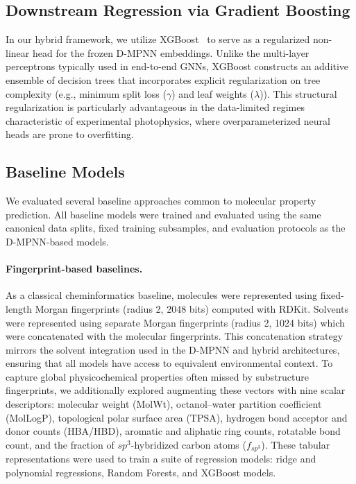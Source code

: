 \subsection{Downstream Regression via Gradient Boosting}
In our hybrid framework, we utilize XGBoost~\cite{chen2016xgboost} to serve as a regularized non-linear head for the frozen D-MPNN embeddings. Unlike the multi-layer perceptrons typically used in end-to-end GNNs, XGBoost constructs an additive ensemble of decision trees that incorporates explicit regularization on tree complexity (e.g., minimum split loss ($\gamma$) and leaf weights ($\lambda$)). This structural regularization is particularly advantageous in the data-limited regimes characteristic of experimental photophysics, where overparameterized neural heads are prone to overfitting.


\subsection{Baseline Models}

We evaluated several baseline approaches common to molecular property prediction. All baseline models were trained and evaluated using the same canonical data splits, fixed training subsamples, and evaluation protocols as the D-MPNN-based models.


\paragraph{Fingerprint-based baselines.}
As a classical cheminformatics baseline, molecules were represented using fixed-length Morgan fingerprints (radius 2, 2048 bits) computed with RDKit. Solvents were represented using separate Morgan fingerprints (radius 2, 1024 bits) which were concatenated with the molecular fingerprints. This concatenation strategy mirrors the solvent integration used in the D-MPNN and hybrid architectures, ensuring that all models have access to equivalent environmental context. To capture global physicochemical properties often missed by substructure fingerprints, we additionally explored augmenting these vectors with nine scalar descriptors: molecular weight (MolWt), octanol--water partition coefficient (MolLogP), topological polar surface area (TPSA), hydrogen bond acceptor and donor counts (HBA/HBD), aromatic and aliphatic ring counts, rotatable bond count, and the fraction of $sp^3$-hybridized carbon atoms ($f_{sp^3}$). These tabular representations were used to train a suite of regression models: ridge and polynomial regressions, Random Forests, and XGBoost models.

